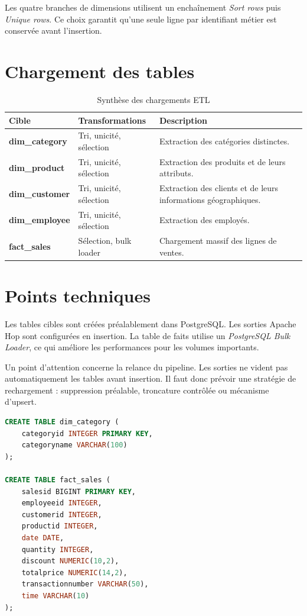 \documentclass[12pt,a4paper,twoside]{report}
\begin{document}
Les quatre branches de dimensions utilisent un enchaînement \textit{Sort rows} puis \textit{Unique rows}. Ce choix garantit qu'une seule ligne par identifiant métier est conservée avant l'insertion.

\section{Chargement des tables}

\begin{table}[H]
\centering
{}
\begin{tabularx}{\textwidth}{>{\bfseries}p{3cm}p{4.5cm}X}
\toprule
\rowcolor{TableHeader}
\color{white}Cible & \color{white}Transformations & \color{white}Description \\
\midrule
dim\_category & Tri, unicité, sélection & Extraction des catégories distinctes. \\
dim\_product & Tri, unicité, sélection & Extraction des produits et de leurs attributs. \\
dim\_customer & Tri, unicité, sélection & Extraction des clients et de leurs informations géographiques. \\
dim\_employee & Tri, unicité, sélection & Extraction des employés. \\
fact\_sales & Sélection, bulk loader & Chargement massif des lignes de ventes. \\
\bottomrule
\end{tabularx}
\caption{Synthèse des chargements ETL}
\end{table}

\section{Points techniques}

Les tables cibles sont créées préalablement dans PostgreSQL. Les sorties Apache Hop sont configurées en insertion. La table de faits utilise un \textit{PostgreSQL Bulk Loader}, ce qui améliore les performances pour les volumes importants.

Un point d'attention concerne la relance du pipeline. Les sorties ne vident pas automatiquement les tables avant insertion. Il faut donc prévoir une stratégie de rechargement : suppression préalable, troncature contrôlée ou mécanisme d'upsert.

\begin{lstlisting}[language=SQL,caption={Extrait simplifié du modèle relationnel cible}]
CREATE TABLE dim_category (
    categoryid INTEGER PRIMARY KEY,
    categoryname VARCHAR(100)
);

CREATE TABLE fact_sales (
    salesid BIGINT PRIMARY KEY,
    employeeid INTEGER,
    customerid INTEGER,
    productid INTEGER,
    date DATE,
    quantity INTEGER,
    discount NUMERIC(10,2),
    totalprice NUMERIC(14,2),
    transactionnumber VARCHAR(50),
    time VARCHAR(10)
);
\end{lstlisting}
\end{document}
